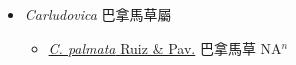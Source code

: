 
  \begin{itemize}
 \item[] \textit{Carludovica} 巴拿馬草屬
                    
  \begin{itemize}
        \item[] \href{http://www.theplantlist.org/tpl1.1/search?q=Carludovica+palmata}{\textit{C. palmata} Ruiz \& Pav.}   巴拿馬草 NA$^n$
  \end{itemize}
  \end{itemize}
